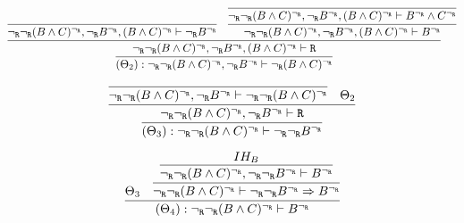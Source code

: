 \begin{enumerate}[(i)]
\begin{itemize}
            $$
            \infer{
                            (\Theta_2) : \neg_\R\neg_\R(B \wedge C)^{\neg_\R}, \neg_\R B^{\neg_\R} \vdash \neg_\R(B \wedge C)^{\neg_\R}
                        }{
                            \infer{
                                \neg_\R\neg_\R(B \wedge C)^{\neg_\R}, \neg_\R B^{\neg_\R}, (B \wedge C)^{\neg_\R} \vdash \R
                            }{
                                \infer{
                                    \neg_\R\neg_\R(B \wedge C)^{\neg_\R}, \neg_\R B^{\neg_\R}, (B \wedge C)^{\neg_\R} \vdash \neg_\R B^{\neg_\R}
                                }{
                                }&
                                \infer{
                                    \neg_\R\neg_\R(B \wedge C)^{\neg_\R}, \neg_\R B^{\neg_\R}, (B \wedge C)^{\neg_\R} \vdash B^{\neg_\R}
                                }{
                                    \infer{
                                        \neg_\R\neg_\R(B \wedge C)^{\neg_\R}, \neg_\R B^{\neg_\R}, (B \wedge C)^{\neg_\R} \vdash B^{\neg_\R} \wedge C^{\neg_\R}
                                    }{
                                    }
                                }
                            }
                        }
            $$        
        
            $$
            \infer{
                    (\Theta_3) : \neg_\R\neg_\R(B \wedge C)^{\neg_\R} \vdash \neg_\R\neg_\R B^{\neg_\R}
                }{
                    \infer{
                        \neg_\R\neg_\R(B \wedge C)^{\neg_\R}, \neg_\R B^{\neg_\R} \vdash \R
                    }{
                        \infer{
                            \neg_\R\neg_\R(B \wedge C)^{\neg_\R}, \neg_\R B^{\neg_\R} \vdash \neg_\R\neg_\R(B \wedge C)^{\neg_\R}
                        }{
                        }&
                        \Theta_2
                    }
                }
            $$        
        
            $$
            \infer{
                (\Theta_4) : \neg_\R\neg_\R(B \wedge C)^{\neg_\R} \vdash B^{\neg_\R}
            }{
                \Theta_3
                &
                \infer{
                    \neg_\R\neg_\R(B \wedge C)^{\neg_\R} \vdash \neg_\R\neg_\R B^{\neg_\R} \Rightarrow  B^{\neg_\R}
                }{
                    \infer{
                        \neg_\R\neg_\R(B \wedge C)^{\neg_\R}, \neg_\R\neg_\R B^{\neg_\R} \vdash  B^{\neg_\R}
                    }{
                        IH_B
                    }
                }
            }
            $$
            

\end{itemize}
\end{enumerate}

